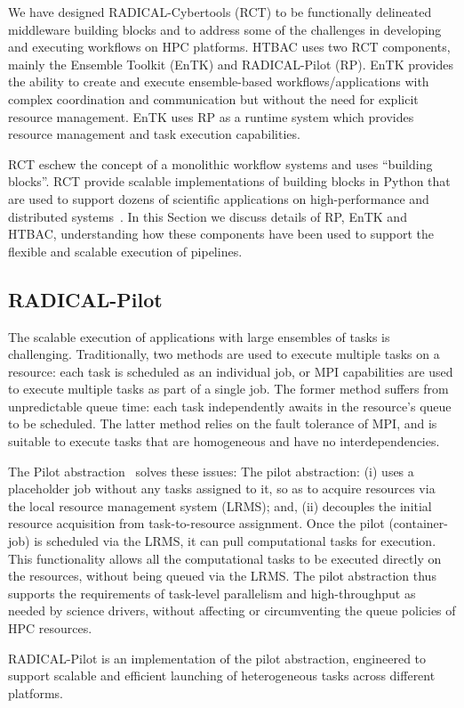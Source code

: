 We have designed RADICAL-Cybertools (RCT) to be functionally delineated
middleware building blocks and to address some of the challenges in
developing and executing workflows on HPC platforms. HTBAC uses two RCT
components, mainly the Ensemble Toolkit (EnTK) and RADICAL-Pilot (RP).
EnTK provides the ability to create and execute ensemble-based
workflows/applications with complex coordination and communication but
without the need for explicit resource management. EnTK uses RP as a
runtime system which provides resource management and task execution
capabilities.

RCT eschew the concept of a monolithic workflow systems and uses ``building
blocks''. RCT provide scalable implementations of building blocks in Python
that are used to support dozens of scientific applications on
high-performance and distributed systems~\cite{turilli2016analysis,angius2017converging,treikalis2016repex, balasubramanian2016ensemble,balasubramanian2016extasy}. In this Section we discuss details of RP, EnTK
and HTBAC, understanding how these components have been used to support the
flexible and scalable execution of pipelines.

\subsection{RADICAL-Pilot}

The scalable execution of applications with large ensembles of tasks is
challenging. Traditionally, two methods are used to execute multiple tasks on
a resource: each task is scheduled as an individual job, or MPI capabilities
are used to execute multiple tasks as part of a single job. The former method
suffers from unpredictable queue time: each task independently awaits in the
resource's queue to be scheduled. The latter method relies on the fault
tolerance of MPI, and is suitable to execute tasks that are homogeneous and
have no interdependencies.

The Pilot abstraction~\cite{turilli2017comprehensive} solves these issues:
The pilot abstraction: (i) uses a placeholder job without any tasks assigned
to it, so as to acquire resources via the local resource management system
(LRMS); and, (ii) decouples the initial resource acquisition from
task-to-resource assignment. Once the pilot (container-job) is scheduled via
the LRMS, it can pull computational tasks for execution. This functionality
allows all the computational tasks to be executed directly on the resources,
without being queued via the LRMS\@. %
The pilot abstraction thus supports the requirements of task-level
parallelism and high-throughput as needed by science drivers, without
affecting or circumventing the queue policies of HPC resources.

RADICAL-Pilot is an implementation of the pilot abstraction, engineered to
support scalable and efficient launching of heterogeneous tasks across
different platforms.